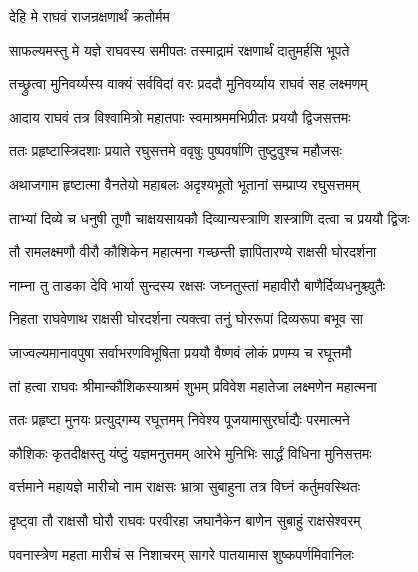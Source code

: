
\onelineshloka
{देहि मे राघवं राजन्रक्षणार्थं क्रतोर्मम}%

\twolineshloka
{साफल्यमस्तु मे यज्ञे राघवस्य समीपतः}
{तस्माद्रामं रक्षणार्थं दातुमर्हसि भूपते}%


\twolineshloka
{तच्छ्रुत्वा मुनिवर्य्यस्य वाक्यं सर्वविदां वरः}
{प्रददौ मुनिवर्य्याय राघवं सह लक्ष्मणम्}%

\twolineshloka
{आदाय राघवं तत्र विश्वामित्रो महातपाः}
{स्वमाश्रममभिप्रीतः प्रययौ द्विजसत्तमः}%

\twolineshloka
{ततः प्रहृष्टास्त्रिदशाः प्रयाते रघुसत्तमे}
{ववृषुः पुष्पवर्षाणि तुष्टुवुश्च महौजसः}%

\twolineshloka
{अथाजगाम हृष्टात्मा वैनतेयो महाबलः}
{अदृश्यभूतो भूतानां सम्प्राप्य रघुसत्तमम्}%

\twolineshloka
{ताभ्यां दिव्ये च धनुषी तूणौ चाक्षयसायकौ}
{दिव्यान्यस्त्राणि शस्त्राणि दत्वा च प्रययौ द्विजः}%

\twolineshloka
{तौ रामलक्ष्मणौ वीरौ कौशिकेन महात्मना}
{गच्छन्ती ज्ञापितारण्ये राक्षसी घोरदर्शना}%

\twolineshloka
{नाम्ना तु ताडका देवि भार्या सुन्दस्य रक्षसः}
{जघ्नतुस्तां महावीरौ बाणैर्दिव्यधनुश्च्युतैः}%

\twolineshloka
{निहता राघवेणाथ राक्षसी घोरदर्शना}
{त्यक्त्वा तनुं घोररूपां दिव्यरूपा बभूव सा}%

\twolineshloka
{जाज्वल्यमानावपुषा सर्वाभरणविभूषिता}
{प्रययौ वैष्णवं लोकं प्रणम्य च रघूत्तमौ}%

\twolineshloka
{तां हत्वा राघवः श्रीमान्कौशिकस्याश्रमं शुभम्}
{प्रविवेश महातेजा लक्ष्मणेन महात्मना}%

\twolineshloka
{ततः प्रहृष्टा मुनयः प्रत्युद्गम्य रघूत्तमम्}
{निवेश्य पूजयामासुरर्घाद्यैः परमात्मने}%

\twolineshloka
{कौशिकः कृतदीक्षस्तु यंष्टुं यज्ञमनुत्तमम्}
{आरेभे मुनिभिः सार्द्धं विधिना मुनिसत्तमः}%

\twolineshloka
{वर्त्तमाने महायज्ञे मारीचो नाम राक्षसः}
{भ्रात्रा सुबाहुना तत्र विघ्नं कर्तुमवस्थितः}%

\twolineshloka
{दृष्ट्वा तौ राक्षसौ घोरौ राघवः परवीरहा}
{जघानैकेन बाणेन सुबाहुं राक्षसेश्वरम्}%

\twolineshloka
{पवनास्त्रेण महता मारीचं स निशाचरम्}
{सागरे पातयामास शुष्कपर्णमिवानिलः}%

